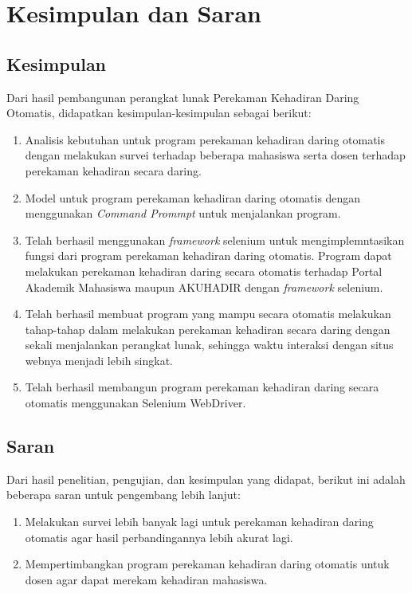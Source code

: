\chapter{Kesimpulan dan Saran}
\label{chap:simpulandansaran}

\section{Kesimpulan}
\label{sec:kesimpulan} 
Dari hasil pembangunan perangkat lunak Perekaman Kehadiran Daring Otomatis, didapatkan kesimpulan-kesimpulan sebagai berikut:
\begin{enumerate}
	\item Analisis kebutuhan untuk program perekaman kehadiran daring otomatis dengan melakukan survei terhadap beberapa mahasiswa serta dosen terhadap perekaman kehadiran secara daring.
	\item Model untuk program perekaman kehadiran daring otomatis dengan menggunakan \textit{Command Prommpt} untuk menjalankan program.
	\item Telah berhasil menggunakan \textit{framework} selenium untuk mengimplemntasikan fungsi dari program perekaman kehadiran daring otomatis. Program dapat melakukan perekaman kehadiran daring secara otomatis terhadap Portal Akademik Mahasiswa maupun AKUHADIR dengan \textit{framework} selenium.
	\item Telah berhasil membuat program yang mampu secara otomatis melakukan tahap-tahap dalam melakukan perekaman kehadiran secara daring dengan sekali menjalankan perangkat lunak, sehingga waktu interaksi dengan situs webnya menjadi lebih singkat. 
	\item Telah berhasil membangun program perekaman kehadiran daring secara otomatis menggunakan Selenium WebDriver.
\end{enumerate}

\section{Saran}
\label{sec:saran} 
Dari hasil penelitian, pengujian, dan kesimpulan yang didapat, berikut ini adalah beberapa saran untuk pengembang lebih lanjut:
\begin{enumerate}
	\item Melakukan survei lebih banyak lagi untuk perekaman kehadiran daring otomatis agar hasil perbandingannya lebih akurat lagi.
	\item Mempertimbangkan program perekaman kehadiran daring otomatis untuk dosen agar dapat merekam kehadiran mahasiswa.
\end{enumerate}


